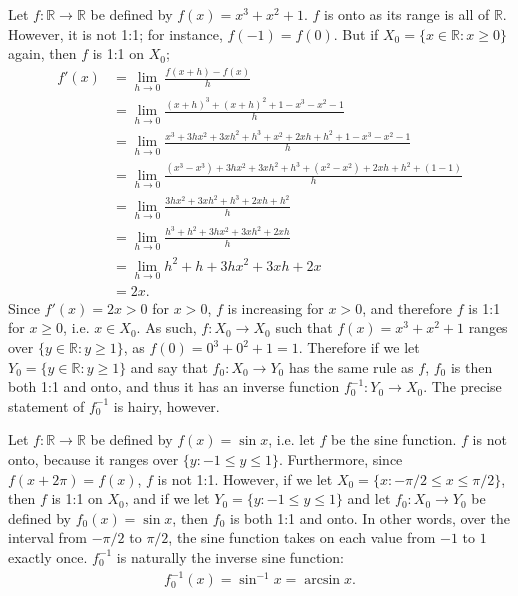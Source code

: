 \documentclass[12pt]{article}
\begin{document}
\begin{exm}
  Let $f: \mathbb{R} \to \mathbb{R}$ be defined by $f(x) = x^3 + x^2 + 1$. $f$ is
  onto as its range is all of $\mathbb{R}$. However, it is not 1:1; for instance,
  $f(-1) = f(0)$. But if $X_0 = \{x \in \mathbb{R}: x \geq 0\}$ again, then $f$ is
  1:1 on $X_0$;
  \begin{align*}
    f'(x) &= \lim_{h \to 0}\frac{f(x + h) - f(x)}{h}\\
    &= \lim_{h \to 0}\frac{(x + h)^3 + (x + h)^2 + 1 - x^3 - x^2 - 1}{h}\\
    &= \lim_{h \to 0}\frac{x^3 + 3hx^2 + 3xh^2 + h^3 + x^2 + 2xh + h^2 + 1 - x^3 - x^2 - 1}{h}\\
    &= \lim_{h \to 0}\frac{(x^3 - x^3) + 3hx^2 + 3xh^2 + h^3 + (x^2 - x^2) + 2xh + h^2 + (1 - 1)}{h}\\
    &= \lim_{h \to 0}\frac{3hx^2 + 3xh^2 + h^3 + 2xh + h^2}{h}\\
    &= \lim_{h \to 0}\frac{h^3 + h^2 + 3hx^2 + 3xh^2 + 2xh}{h}\\
    &= \lim_{h \to 0}h^2 + h + 3hx^2 + 3xh + 2x\\
    &= 2x.
  \end{align*}
  Since $f'(x) = 2x > 0$ for $x > 0$, $f$ is increasing for $x > 0$, and therefore
  $f$ is 1:1 for $x \geq 0$, i.e. $x \in X_0$. As such, $f: X_0 \to X_0$ such that
  $f(x) = x^3 + x^2 + 1$ ranges over $\{y \in \mathbb{R}: y \geq 1\}$, as $f(0) = 0^3
  + 0^2 + 1 = 1$. Therefore if we let $Y_0 = \{y \in \mathbb{R}: y \geq 1\}$ and say
  that $f_0: X_0 \to Y_0$ has the same rule as $f$, $f_0$ is then both 1:1 and onto,
  and thus it has an inverse function $f_0^{-1}: Y_0 \to X_0$. The precise statement
  of $f_0^{-1}$ is hairy, however.
\end{exm}

\begin{exm}
  Let $f: \mathbb{R} \to \mathbb{R}$ be defined by $f(x) = \sin x$, i.e. let $f$ be
  the sine function. $f$ is not onto, because it ranges over $\{y: -1 \leq y \leq
  1\}$. Furthermore, since $f(x + 2\pi) = f(x)$, $f$ is not 1:1. However, if we let
  $X_0 = \{x: -\pi/2 \leq x \leq \pi/2\}$, then $f$ is 1:1 on $X_0$, and if we let
  $Y_0 = \{y: -1 \leq y \leq 1\}$ and let $f_0: X_0 \to Y_0$ be defined by $f_0(x) =
  \sin x$, then $f_0$ is both 1:1 and onto. In other words, over the interval from
  $-\pi/2$ to $\pi/2$, the sine function takes on each value from $-1$ to $1$ exactly
  once. $f_0^{-1}$ is naturally the inverse sine function:
  \begin{align*}
    f_0^{-1}(x) = \sin^{-1} x = \arcsin x.
  \end{align*}
\end{exm}
\end{document}
